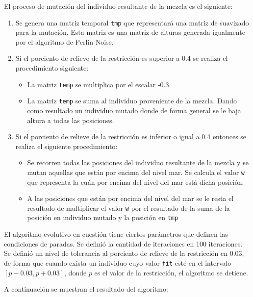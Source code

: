 El proceso de mutación del individuo resultante de la mezcla es el siguiente:

\begin{enumerate}
	\item Se genera una matriz temporal \verb|tmp| que representará una matriz de suavizado para la mutación. Esta matriz es una matriz de alturas generada igualmente por el algoritmo de Perlin Noise.
	\item Si el porciento de relieve de la restricción es superior a 0.4 se realiza el procedimiento siguiente:
	\begin{itemize}
		\item La matriz \verb|temp| se multiplica por el escalar -0.3.
		\item La matriz \verb|temp| se suma al individuo proveniente de la mezcla. Dando como resultado un individuo mutado donde de forma general se le baja altura a todas las posiciones.  
	\end{itemize}
	\item Si el porciento de relieve de la restricción es inferior o igual a 0.4 entonces se realiza el siguiente procedimiento: 
	\begin{itemize}
		\item Se recorren todas las posiciones del individuo resultante de la mezcla y se mutan aquellas que están por encima del nivel mar. Se calcula el valor \verb|w| que representa la cuán por encima del nivel del mar está dicha posición.
		\item A las posiciones que están por encima del nivel del mar se le resta el resultado de multiplicar el valor \verb|w| por el resultado de la suma de la posición en individuo mutado y  la posición en \verb|tmp|
	\end{itemize}
\end{enumerate}

El algoritmo evolutivo en cuestión tiene ciertos parámetros que definen las condiciones de paradas. Se definió la cantidad de iteraciones en 100 iteraciones. Se definió un nivel de tolerancia al porciento de relieve de la restricción en 0.03, de forma que cuando exista un individuo cuyo valor \verb|fit| esté en el intervalo $[p - 0.03, p + 0.03]$, donde $p$ es el valor de la restricción, el algoritmo se detiene.

A continuación se muestran el resultado del algoritmo:

